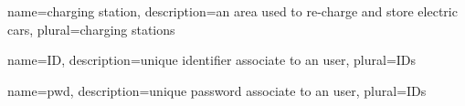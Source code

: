 {
  name={charging station},
  description={an area used to re-charge and store electric cars},
  plural={charging stations}
}

{
  name={ID},
  description={unique identifier associate to an user},
  plural={IDs}
}

{
  name={pwd},
  description={unique password associate to an user},
  plural={IDs}
}

